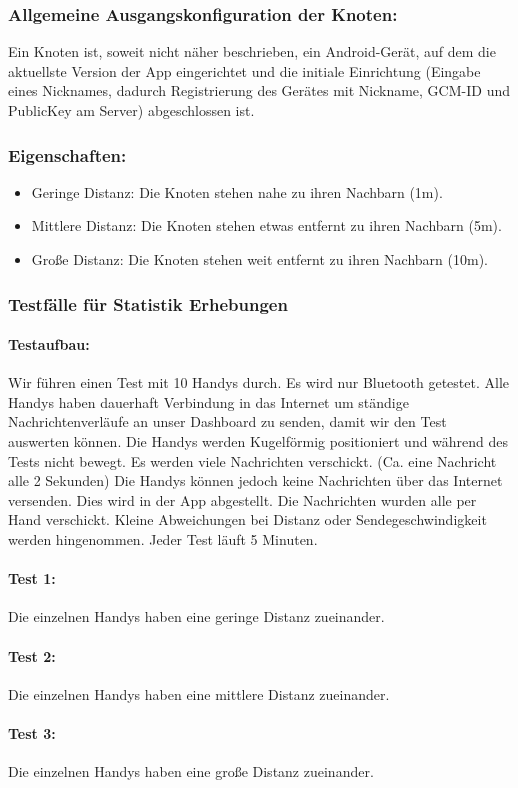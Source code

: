 \subsubsection{Allgemeine Ausgangskonfiguration der Knoten:}\label{Ausgangskonfiguration}

Ein Knoten ist, soweit nicht näher beschrieben, ein Android-Gerät, auf dem die aktuellste Version der App eingerichtet und die initiale Einrichtung (Eingabe eines Nicknames, dadurch Registrierung des Gerätes mit Nickname, GCM-ID und PublicKey am Server) abgeschlossen ist.

\subsubsection{Eigenschaften:}\label{Eigenschaften}

\begin{itemize}
\tightlist
\item
Geringe Distanz: Die Knoten stehen nahe zu ihren Nachbarn (1m).
\item
Mittlere Distanz: Die Knoten stehen etwas entfernt zu ihren Nachbarn (5m).
\item
Große Distanz: Die Knoten stehen weit entfernt zu ihren Nachbarn (10m).
\end{itemize}

\subsubsection{Testfälle für Statistik Erhebungen}\label{Testfaelle}

\paragraph*{Testaufbau:}
Wir führen einen Test mit 10 Handys durch. Es wird nur Bluetooth getestet. Alle Handys haben dauerhaft Verbindung in das Internet um ständige Nachrichtenverläufe an unser Dashboard zu senden, damit wir den Test auswerten können. Die Handys werden Kugelförmig positioniert und
während des Tests nicht bewegt. Es werden viele Nachrichten verschickt. (Ca. eine Nachricht alle 2 Sekunden) Die Handys können jedoch keine Nachrichten über das Internet versenden. Dies wird in der App abgestellt. Die Nachrichten wurden alle per Hand verschickt. Kleine Abweichungen bei Distanz oder Sendegeschwindigkeit werden hingenommen. Jeder Test läuft 5 Minuten. 
\paragraph*{Test 1:}
Die einzelnen Handys haben eine geringe Distanz zueinander. 
\paragraph*{Test 2:}
Die einzelnen Handys haben eine mittlere Distanz zueinander. 
\paragraph*{Test 3:}
Die einzelnen Handys haben eine große Distanz zueinander. 
